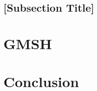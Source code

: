 \documentclass[a4paper,12pt]{article}
\begin{document}
\subsection{{[Subsection Title]}}
\lipsum[11]

\newpage

\section{GMSH}
\label{sec:section4}

\lipsum[12-13]

\newpage 

\section{{Conclusion}} \label{sec:conclusion}

\lipsum[20]

\label{MyLastPage}
\end{document}
